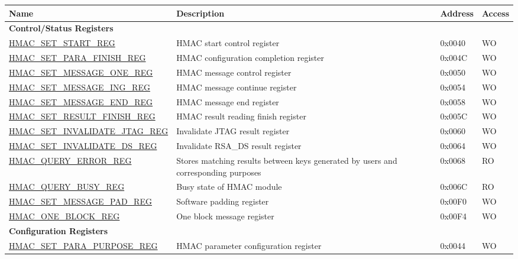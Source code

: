 \begin{longtable}{ | p{6cm} | p{7.2cm} | p{1.3cm} | p{1cm} | }
\hline\rowcolor{lightgray}
Name & Description &  Address & Access \\ \hline
\endhead
\multicolumn{4}{|l|}{\textbf{Control/Status Registers}} \\ \hline
\hyperref[regdesc:HMACSETSTARTREG]{HMAC\_SET\_START\_REG} & HMAC start control register & 0x0040 & WO \\ \hline
\hyperref[regdesc:HMACSETPARAFINISHREG]{HMAC\_SET\_PARA\_FINISH\_REG} & HMAC configuration completion register & 0x004C & WO \\ \hline
\hyperref[regdesc:HMACSETMESSAGEONEREG]{HMAC\_SET\_MESSAGE\_ONE\_REG} & HMAC message control register & 0x0050 & WO \\ \hline
\hyperref[regdesc:HMACSETMESSAGEINGREG]{HMAC\_SET\_MESSAGE\_ING\_REG} & HMAC message continue register & 0x0054 & WO \\ \hline
\hyperref[regdesc:HMACSETMESSAGEENDREG]{HMAC\_SET\_MESSAGE\_END\_REG} & HMAC message end register & 0x0058 & WO \\ \hline
\hyperref[regdesc:HMACSETRESULTFINISHREG]{HMAC\_SET\_RESULT\_FINISH\_REG} & HMAC result reading finish register & 0x005C & WO \\ \hline
\hyperref[regdesc:HMACSETINVALIDATEJTAGREG]{HMAC\_SET\_INVALIDATE\_JTAG\_REG} & Invalidate JTAG result register & 0x0060 & WO \\ \hline
\hyperref[regdesc:HMACSETINVALIDATEDSREG]{HMAC\_SET\_INVALIDATE\_DS\_REG} & Invalidate RSA\_DS result register & 0x0064 & WO \\ \hline
\hyperref[regdesc:HMACQUERYERRORREG]{HMAC\_QUERY\_ERROR\_REG} & Stores matching results between keys generated by users and corresponding purposes & 0x0068 & RO \\ \hline
\hyperref[regdesc:HMACQUERYBUSYREG]{HMAC\_QUERY\_BUSY\_REG} & Busy state of HMAC module & 0x006C & RO \\ \hline
\hyperref[regdesc:HMACSETMESSAGEPADREG]{HMAC\_SET\_MESSAGE\_PAD\_REG} & Software padding register & 0x00F0 & WO \\ \hline
\hyperref[regdesc:HMACONEBLOCKREG]{HMAC\_ONE\_BLOCK\_REG} & One block message register & 0x00F4 & WO \\ \hline
\multicolumn{4}{|l|}{\textbf{Configuration Registers}} \\ \hline
\hyperref[regdesc:HMACSETPARAPURPOSEREG]{HMAC\_SET\_PARA\_PURPOSE\_REG} & HMAC parameter configuration register & 0x0044 & WO \\ \hline

\end{longtable}
